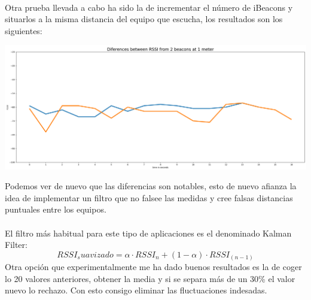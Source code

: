 \documentclass[a4paper ,12pt, onecolumn]{article}
\begin{document}
                \paragraph{}
                Otra prueba llevada a cabo ha sido la de incrementar el número de iBeacons y situarlos a la misma distancia del 
                equipo que escucha, los resultados son los siguientes:
                \begin{center}
                    \includegraphics[scale=0.2]{10min_2beacons_same_distance.PNG}
                \end{center}
                Podemos ver de nuevo que las diferencias son notables, esto de nuevo afianza la idea de implementar
                un filtro que no falsee las medidas y cree falsas distancias puntuales entre los equipos.
                \paragraph{}
                El filtro más habitual para este tipo de aplicaciones es el denominado Kalman Filter:
                \begin{equation}
                    RSSI_suavizado=\alpha · RSSI_{n} + (1-\alpha) · RSSI_{(n-1)}
                \end{equation}
                Otra opción que experimentalmente me ha dado buenos resultados es la de coger lo 20 valores anteriores,
                obtener la media y si se separa más de un 30\% el valor nuevo lo rechazo. Con esto consigo eliminar las 
                fluctuaciones indesadas.
\end{document}
